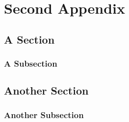 \chapter{Second Appendix}
\section{A Section}
\subsection{A Subsection}
\section{Another Section}
\subsection{Another Subsection}
